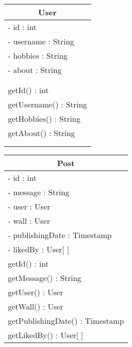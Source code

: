 \documentclass[parskip=half*]{scrartcl}
\begin{document}
\begin{figure}[htb]
    \centering
    \begin{tabular}[t]{|l|}
    \hline
    \multicolumn{1}{|c|}{\bfseries User} \\ \hline
     - id : int  \\
     - username : String  \\
     - hobbies : String  \\
     - about : String  \\  \\ \\ \hline
     getId() : int  \\
     getUsername() : String  \\
     getHobbies() : String  \\
     getAbout() : String  \\  \\ \\ \hline
    \end{tabular}
    \hspace{0.8cm}
    \begin{tabular}[t]{|l|}
    \hline
    \multicolumn{1}{|c|}{\bfseries Post} \\ \hline
     - id : int  \\
     - message : String \\
     - user : User  \\
     - wall : User  \\
     - publishingDate : Timestamp  \\
     - likedBy : User[ ]  \\ \hline
     getId() : int  \\
     getMessage() : String  \\
     getUser() : User  \\
     getWall() : User  \\
     getPublishingDate() : Timestamp  \\
     getLikedBy() : User[ ] \\ \hline
    \end{tabular}
    \label{fig:klasse_User_Post}
\end{figure}
\end{document}
